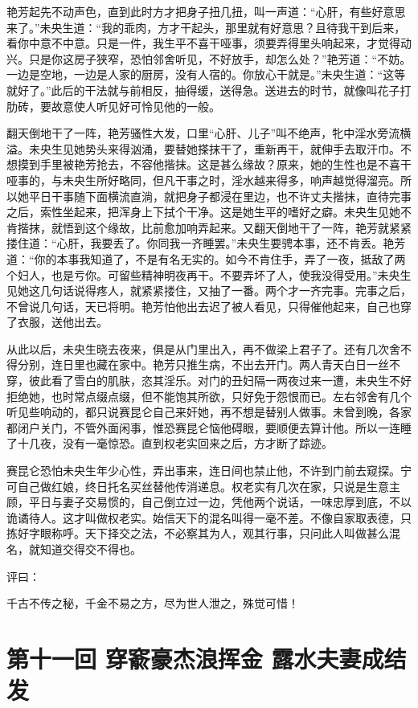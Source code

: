 \documentclass[a4paper,12pt,UTF8,twoside]{ctexbook}
\begin{document}
艳芳起先不动声色，直到此时方才把身子扭几扭，叫一声道：“心肝，有些好意思来了。”未央生道：“我的乖肉，方才干起头，那里就有好意思？且待我干到后来，看你中意不中意。只是一件，我生平不喜干哑事，须要弄得里头响起来，才觉得动兴。只是你这房子狭窄，恐怕邻舍听见，不好放手，却怎么处？”艳芳道：“不妨。一边是空地，一边是人家的厨房，没有人宿的。你放心干就是。”未央生道：“这等就好了。”此后的干法就与前相反，抽得缓，送得急。送进去的时节，就像叫花子打肋砖，要故意使人听见好可怜见他的一般。

翻天倒地干了一阵，艳芳骚性大发，口里“心肝、儿子”叫不绝声，牝中淫水旁流横溢。未央生见她势头来得汹涌，要替她搽抹干了，重新再干，就伸手去取汗巾。不想摸到手里被艳芳抢去，不容他揩抹。这是甚么缘故？原来，她的生性也是不喜干哑事的，与未央生所好略同，但凡干事之时，淫水越来得多，响声越觉得溜亮。所以她平日干事随下面横流直淌，就把身子都浸在里边，也不许丈夫揩抹，直待完事之后，索性坐起来，把浑身上下拭个干净。这是她生平的嗜好之癖。未央生见她不肯揩抹，就悟到这个缘故，比前愈加响弄起来。又翻天倒地干了一阵，艳芳就紧紧搂住道：“心肝，我要丢了。你同我一齐睡罢。”未央生要骋本事，还不肯丢。艳芳道：“你的本事我知道了，不是有名无实的。如今不肯住手，弄了一夜，抵敌了两个妇人，也是亏你。可留些精神明夜再干。不要弄坏了人，使我没得受用。”未央生见她这几句话说得疼人，就紧紧搂住，又抽了一番。两个才一齐完事。完事之后，不曾说几句话，天已将明。艳芳怕他出去迟了被人看见，只得催他起来，自己也穿了衣服，送他出去。

从此以后，未央生晓去夜来，俱是从门里出入，再不做梁上君子了。还有几次舍不得分别，连日里也藏在家中。艳芳只推生病，不出去开门。两人青天白日一丝不穿，彼此看了雪白的肌肤，恣其淫乐。对门的丑妇隔一两夜过来一遭，未央生不好拒绝她，也时常点缀点缀，但不能饱其所欲，只好免于怨恨而已。左右邻舍有几个听见些响动的，都只说赛昆仑自己来奸她，再不想是替别人做事。未曾到晚，各家都闭户关门，不管外面闲事，惟恐赛昆仑恼他碍眼，要顺便去算计他。所以一连睡了十几夜，没有一毫惊恐。直到权老实回来之后，方才断了踪迹。

赛昆仑恐怕未央生年少心性，弄出事来，连日间也禁止他，不许到门前去窥探。宁可自己做红娘，终日托名买丝替他传消递息。权老实有几次在家，只说是生意主顾，平日与妻子交易惯的，自己倒立过一边，凭他两个说话，一味忠厚到底，不以诡谲待人。这才叫做权老实。始信天下的混名叫得一毫不差。不像自家取表德，只拣好字眼称呼。天下择交之法，不必察其为人，观其行事，只问此人叫做甚么混名，就知道交得交不得也。

评曰：

千古不传之秘，千金不易之方，尽为世人泄之，殊觉可惜！

\chapter{第十一回 穿窬豪杰浪挥金 露水夫妻成结发}
\end{document}

